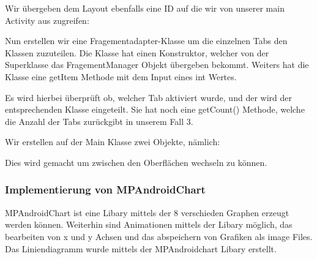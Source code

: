 

Wir übergeben dem Layout ebenfalls eine ID auf die wir von unserer main Activity aus zugreifen: 




Nun erstellen wir eine Fragementadapter-Klasse um die einzelnen Tabs den Klassen zuzuteilen. 
Die Klasse hat einen Konstruktor, welcher von der Superklasse das FragementManager Objekt übergeben bekommt.
Weiters hat die Klasse eine getItem Methode mit dem Input eines int Wertes. 



Es wird hierbei überprüft ob, welcher Tab aktiviert wurde, und der wird der entsprechenden Klasse eingeteilt. 
Sie hat noch eine getCount() Methode, welche die Anzahl der Tabs zurückgibt in unserem Fall 3.


Wir erstellen auf der Main Klasse zwei Objekte, nämlich:


Dies wird gemacht um zwischen den Oberflächen wechseln zu können.

 

\subsubsection*{Implementierung von MPAndroidChart}
MPAndroidChart ist eine Libary mittels der 8 verschieden Graphen erzeugt werden können. Weiterhin sind Animationen mittels der Libary möglich, das bearbeiten von x und y Achsen und das abspeichern von Grafiken als image Files.
Das Liniendiagramm wurde mittels der MPAndroidchart Libary erstellt.




